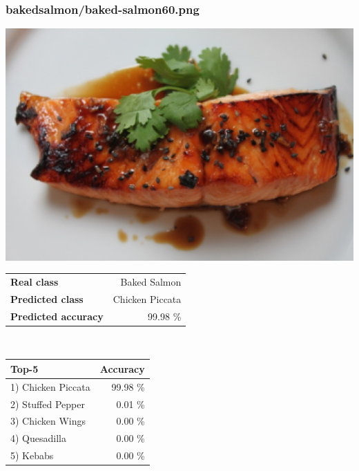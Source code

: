 \subsubsection{baked\textunderscore salmon/baked-salmon60.png}

\begin{minipage}[t]{0.4\textwidth}
	\vspace{0pt}
	\includegraphics[width=\linewidth]{images/evaluation-images/baked_salmon/baked-salmon60.png}
\end{minipage}
\hfill
\begin{minipage}[t]{0.5\textwidth}
	\vspace{0pt}\raggedright
	\begin{tabularx}{\textwidth}{X r}
		\small \textbf{Real class} & \small Baked Salmon\\
		\small \textbf{Predicted class} & \small Chicken Piccata\\
		\small \textbf{Predicted accuracy} & \small 99.98 \%
    \end{tabularx}\\
    
    \vspace{6pt}
	\begin{tabularx}{\textwidth}{X r}
        \small \textbf{Top-5} & \small \textbf{Accuracy} \\
        \hline
		\small 1) Chicken Piccata & \small 99.98 \%\\\small 2) Stuffed Pepper & \small 0.01 \%\\\small 3) Chicken Wings & \small 0.00 \%\\\small 4) Quesadilla & \small 0.00 \%\\\small 5) Kebabs & \small 0.00 \%
    \end{tabularx}
\end{minipage}
    
